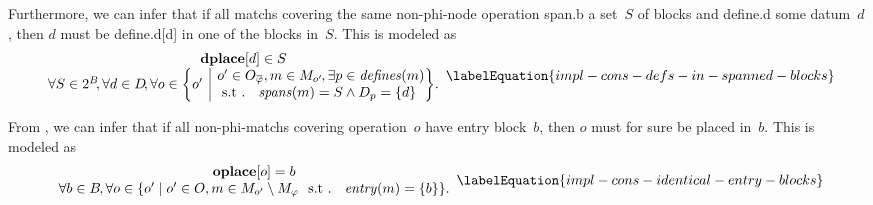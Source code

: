 Furthermore, we can infer that if all \glspl{match} covering the same
non-\gls{phi-node} \gls{operation} \gls{span.b} a set~$S$ of \glspl{block} and
\gls{define.d} some \gls{datum}~$d$\hspace{-1pt}, then $d$ must be
\gls{define.d}[d] in one of the \glspl{block} in~$S$\hspace{-.8pt}.
%
This is modeled as
%
\begin{equation}
  \begin{array}{c}
    \mVar{dplace}[d] \in S \\
    \forall S \in \mPowerset{\mBlockSet} \hspace{-2pt},
    \forall d \in \mDataSet \!,
    \forall o \in
      \mSetBuilder*{o'}%
                   {%
                     \begin{array}{@{}l@{}}
                       o' \in \mOpCompSet{\mPhi},
                       m \in \mMatchSet[o'] \hspace{-1pt},
                       \exists p \in \mDefines(m) \\
                       \text{\st }
                       \mSpans(m) = S \mAnd \mDataSet[p] = \mSet{d}
                     \end{array}
                   } \!.
  \end{array}
  \labelEquation{impl-cons-defs-in-spanned-blocks}
\end{equation}

From , we can infer that if all
non-\glspl{phi-match} covering \gls{operation}~$o$ have \gls{entry
  block}~$b$\hspace{-1pt}, then $o$ must for sure be placed in~$b$\hspace{-1pt}.
%
This is modeled as
%
\begin{equation}
  \begin{array}{c}
    \mVar{oplace}[o] = b \\
    \forall b \in \mBlockSet \hspace{-1pt},
    \forall o \in
      \mSetBuilder{o'}%
                  {%
                    o' \in \mOpSet,
                    m \in \mMatchSet[o'] \setminus \mPhiMatchSet
                    \text{ \st }
                    \mEntry(m) = \mSet{b}
                  }.
  \end{array}
  \labelEquation{impl-cons-identical-entry-blocks}
\end{equation}

